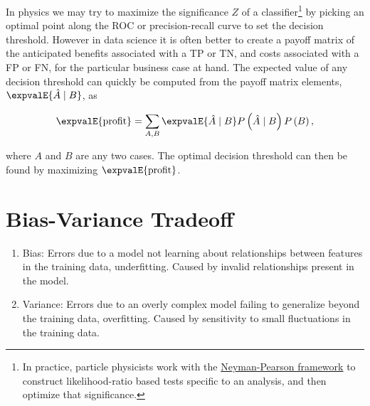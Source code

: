 In physics we may try to maximize the significance $Z$ of a classifier\footnote{In practice,
particle physicists work with the \href{https://en.wikipedia.org/wiki/Neyman\%E2\%80\%93Pearson\_lemma}{Neyman-Pearson framework}
to construct likelihood-ratio based tests specific to an analysis, and then optimize that significance.} by
picking an optimal point along the ROC or precision-recall curve to set the decision threshold.
However in data science it is often better to create a payoff matrix of the anticipated
benefits associated with a TP or TN, and costs associated with a FP or FN,
for the particular business case at hand.
The expected value of any decision threshold can quickly be computed
from the payoff matrix elements, $\expvalE{\hat{A} \mid B}$, as

\begin{equation} \label{eq:E_profit}
\expvalE{\text{profit}} = \sum_{A,B} \expvalE{\hat{A} \mid B} P\left(\hat{A} \mid B \right) P\left(B\right),
\end{equation}

\noindent where $A$ and $B$ are any two cases.
The optimal decision threshold can then be found by maximizing $\expvalE{\text{profit}}$.

\section{Bias-Variance Tradeoff}
\label{ml_general:bias_variance_tradeoff}

\begin{enumerate}[noitemsep]
  \item Bias: Errors due to a model not learning about relationships between features in the training data, \ie underfitting. Caused by invalid relationships present in the model.
  \item Variance: Errors due to an overly complex model failing to generalize beyond the training data, \ie overfitting. Caused by sensitivity to small fluctuations in the training data.
\end{enumerate}

